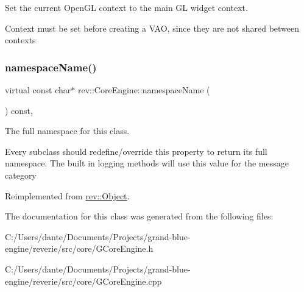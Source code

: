 Set the current Open\+GL context to the main GL widget context. 

Context must be set before creating a V\+AO, since they are not shared between contexts \mbox{\label{classrev_1_1_core_engine_aa45b34f7023b9f0e3b30f8b1259aa389}} 
\subsubsection{\texorpdfstring{namespaceName()}{namespaceName()}}
{\footnotesize\ttfamily virtual const char$\ast$ rev\+::\+Core\+Engine\+::namespace\+Name (\begin{DoxyParamCaption}{ }\end{DoxyParamCaption}) const\hspace{0.3cm}{\ttfamily [inline]}, {\ttfamily [virtual]}}



The full namespace for this class. 

Every subclass should redefine/override this property to return its full namespace. The built in logging methods will use this value for the message category 

Reimplemented from \mbox{\hyperlink{classrev_1_1_object_aaeb638d3e10f361c56c211a318a27f3d}{rev\+::\+Object}}.



The documentation for this class was generated from the following files\+:\begin{DoxyCompactItemize}
\item 
C\+:/\+Users/dante/\+Documents/\+Projects/grand-\/blue-\/engine/reverie/src/core/G\+Core\+Engine.\+h\item 
C\+:/\+Users/dante/\+Documents/\+Projects/grand-\/blue-\/engine/reverie/src/core/G\+Core\+Engine.\+cpp\end{DoxyCompactItemize}
